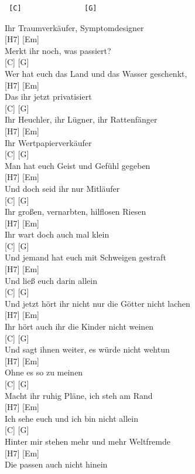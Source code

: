 \documentclass[
  letterpaper,
]{scrbook}
\begin{document}
\begin{verbatim}
 [C]               [G]
\end{verbatim}

Ihr Traumverkäufer, Symptomdesigner\\
{[}H7{]} {[}Em{]}\\
Merkt ihr noch, was passiert?\\
{[}C{]} {[}G{]}\\
Wer hat euch das Land und das Wasser geschenkt,\\
{[}H7{]} {[}Em{]}\\
Das ihr jetzt privatisiert\\
{[}C{]} {[}G{]}\\
Ihr Heuchler, ihr Lügner, ihr Rattenfänger\\
{[}H7{]} {[}Em{]}\\
Ihr Wertpapierverkäufer\\
{[}C{]} {[}G{]}\\
Man hat euch Geist und Gefühl gegeben\\
{[}H7{]} {[}Em{]}\\
Und doch seid ihr nur Mitläufer\\
{[}C{]} {[}G{]}\\
Ihr großen, vernarbten, hilflosen Riesen\\
{[}H7{]} {[}Em{]}\\
Ihr wart doch auch mal klein\\
{[}C{]} {[}G{]}\\
Und jemand hat euch mit Schweigen gestraft\\
{[}H7{]} {[}Em{]}\\
Und ließ euch darin allein\\
{[}C{]} {[}G{]}\\
Und jetzt hört ihr nicht nur die Götter nicht lachen\\
{[}H7{]} {[}Em{]}\\
Ihr hört auch ihr die Kinder nicht weinen\\
{[}C{]} {[}G{]}\\
Und sagt ihnen weiter, es würde nicht wehtun\\
{[}H7{]} {[}Em{]}\\
Ohne es so zu meinen\\
{[}C{]} {[}G{]}\\
Macht ihr ruhig Pläne, ich steh am Rand\\
{[}H7{]} {[}Em{]}\\
Ich sehe euch und ich bin nicht allein\\
{[}C{]} {[}G{]}\\
Hinter mir stehen mehr und mehr Weltfremde\\
{[}H7{]} {[}Em{]}\\
Die passen auch nicht hinein
\end{document}
